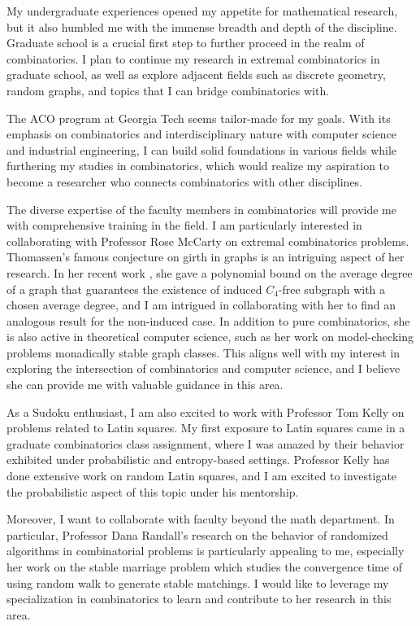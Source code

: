 \documentclass[12pt]{article}
\begin{document}
My undergraduate experiences opened my appetite for mathematical research, but it also humbled me
with the immense breadth and depth of the discipline. Graduate school is a crucial first step to
further proceed in the realm of combinatorics. I plan to continue my research in extremal
combinatorics in graduate school, as well as explore adjacent fields such as discrete geometry,
random graphs, and topics that I can bridge combinatorics with.

The ACO program at Georgia Tech seems tailor-made for my goals. With its emphasis on combinatorics
and interdisciplinary nature with computer science and industrial engineering, I can build solid
foundations in various fields while furthering my studies in combinatorics, which would realize my
aspiration to become a researcher who connects combinatorics with other disciplines. 

The diverse expertise of the faculty members in combinatorics will provide me with comprehensive
training in the field. I am particularly interested in collaborating with Professor Rose McCarty on
extremal combinatorics problems. Thomassen's famous conjecture on girth in graphs is an intriguing
aspect of her research. In her recent work \cite{du2023inducedc4freesubgraphslarge}, she gave a
polynomial bound on the average degree of a graph that guarantees the existence of induced
$C_4$-free subgraph with a chosen average degree, and I am intrigued in collaborating with her to
find an analogous result for the non-induced case. In addition to pure combinatorics, she is also
active in theoretical computer science, such as her work on model-checking problems monadically
stable graph classes\cite{dreier2023firstordermodelcheckingmonadically}. This aligns well with my
interest in exploring the intersection of combinatorics and computer science, and I believe she can
provide me with valuable guidance in this area. 

As a Sudoku enthusiast, I am also excited to work with Professor Tom Kelly on problems related to
Latin squares. My first exposure to Latin squares came in a graduate combinatorics class assignment,
where I was amazed by their behavior exhibited under probabilistic and entropy-based settings.
Professor Kelly has done extensive work on random Latin squares, and I am excited to investigate the
probabilistic aspect of this topic under his mentorship. 

Moreover, I want to collaborate with faculty beyond the math department. In particular, Professor
Dana Randall's research on the behavior of randomized algorithms in combinatorial problems is
particularly appealing to me, especially her work on the stable marriage problem\cite{inproceedings}
which studies the convergence time of using random walk to generate stable matchings. I would like
to leverage my specialization in combinatorics to learn and contribute to her research in this area.
\end{document}

